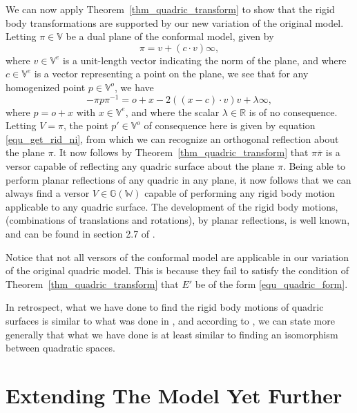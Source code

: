 \documentclass{birkjour}
\theoremstyle{definition}
\theoremstyle{remark}
\numberwithin{equation}{section}
\newcommand{\G}{\mathbb{G}}
\newcommand{\V}{\mathbb{V}}
\newcommand{\W}{\mathbb{W}}
\newcommand{\R}{\mathbb{R}}
\newcommand{\nvao}{o}
\newcommand{\nvai}{\infty}
\begin{document}
We can now apply Theorem~\ref{thm_quadric_transform} to show
that the rigid body transformations are supported by our new variation of the original model.
Letting $\pi\in\V$ be a dual plane of the conformal model, given by
\begin{equation}
\pi = v+(c\cdot v)\nvai,
\end{equation}
where $v\in\V^e$ is a unit-length vector indicating the norm of the plane,
and where $c\in\V^e$ is a vector representing a point on the plane,
we see that for any homogenized point $p\in\V^o$, we have
\begin{equation}
-\pi p\pi^{-1} = \nvao+x-2((x-c)\cdot v)v + \lambda\nvai,
\end{equation}
where $p=\nvao+x$ with $x\in\V^e$, and
where the scalar $\lambda\in\R$ is of no consequence.  Letting $V=\pi$,
the point $p'\in\V^o$ of consequence here is given by equation \eqref{equ_get_rid_ni},
from which we can recognize an orthogonal reflection about the plane $\pi$.
It now follows by Theorem~\ref{thm_quadric_transform} that $\pi\overline{\pi}$ is a versor
capable of reflecting any quadric surface about the plane $\pi$.
Being able to perform planar reflections of any quadric in any plane, it
now follows that we can always find a versor $V\in\G(\W)$ capable of performing
any rigid body motion applicable to any quadric surface.  The development
of the rigid body motions, (combinations of translations and rotations), by planar reflections,
is well known, and can be found in section 2.7 of \cite{LiRockwood}.

Notice that not all versors of the conformal model are applicable in
our variation of the original quadric model.  This is because they fail to
satisfy the condition of Theorem~\ref{thm_quadric_transform} that $E'$ be
of the form \eqref{equ_quadric_form}.

In retrospect, what we have done to find the rigid body motions
of quadric surfaces is similar to what was done in \cite{Langer08}, and
according to \cite{Pfister95}, we can state more generally that what we
have done is at least similar to finding an isomorphism between quadratic spaces.

\section{Extending The Model Yet Further}
\end{document}
